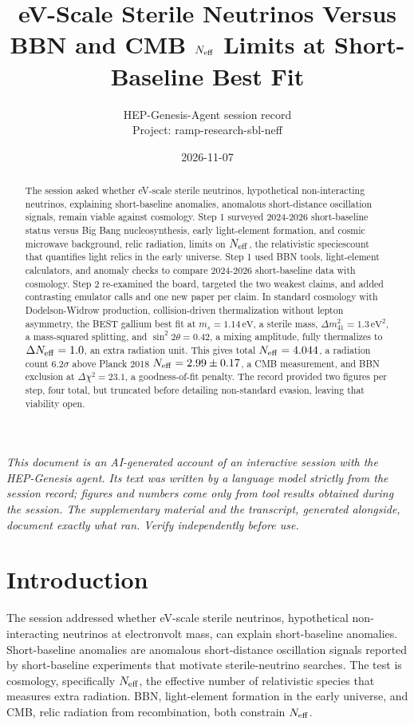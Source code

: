 \documentclass[11pt,a4paper]{article}
\title{eV-Scale Sterile Neutrinos Versus BBN and CMB $N_{\rm eff}$ Limits at Short-Baseline Best Fit}
\author{HEP-Genesis-Agent session record \\ \small Project: ramp-research-sbl-neff}
\date{2026-11-07}
\begin{document}
\maketitle
\noindent\textit{\small This document is an AI-generated account of an interactive session with the HEP-Genesis agent. Its text was written by a language model strictly from the session record; figures and numbers come only from tool results obtained during the session. The supplementary material and the transcript, generated alongside, document exactly what ran. Verify independently before use.}
\vspace{1em}

\begin{abstract}
The session asked whether eV-scale sterile neutrinos, hypothetical non-interacting neutrinos, explaining short-baseline anomalies, anomalous short-distance oscillation signals, remain viable against cosmology. Step 1 surveyed 2024-2026 short-baseline status versus Big Bang nucleosynthesis, early light-element formation, and cosmic microwave background, relic radiation, limits on $N_{\rm eff}$, the relativistic speciescount that quantifies light relics in the early universe. Step 1 used BBN tools, light-element calculators, and anomaly checks to compare 2024-2026 short-baseline data with cosmology. Step 2 re-examined the board, targeted the two weakest claims, and added contrasting emulator calls and one new paper per claim. In standard cosmology with Dodelson-Widrow production, collision-driven thermalization without lepton asymmetry, the BEST gallium best fit at $m_s = 1.14\,\mathrm{eV}$, a sterile mass, $\Delta m^2_{41} = 1.3\,\mathrm{eV}^2$, a mass-squared splitting, and $\sin^2 2\theta = 0.42$, a mixing amplitude, fully thermalizes to $\Delta N_{\rm eff} = 1.0$, an extra radiation unit. This gives total $N_{\rm eff} = 4.044$, a radiation count $6.2\sigma$ above Planck 2018 $N_{\rm eff} = 2.99 \pm 0.17$, a CMB measurement, and BBN exclusion at $\Delta \chi^2 = 23.1$, a goodness-of-fit penalty. The record provided two figures per step, four total, but truncated before detailing non-standard evasion, leaving that viability open.
\end{abstract}
\section{Introduction}
The session addressed whether eV-scale sterile neutrinos, hypothetical non-interacting neutrinos at electronvolt mass, can explain short-baseline anomalies. Short-baseline anomalies are anomalous short-distance oscillation signals reported by short-baseline experiments that motivate sterile-neutrino searches. The test is cosmology, specifically $N_{\rm eff}$, the effective number of relativistic species that measures extra radiation. BBN, light-element formation in the early universe, and CMB, relic radiation from recombination, both constrain $N_{\rm eff}$.
\end{document}
